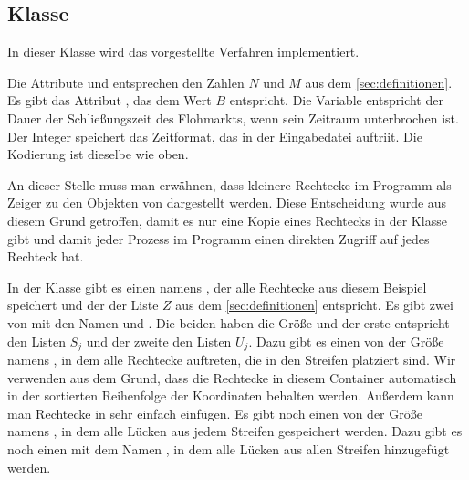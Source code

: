 \subsection{Klasse }
In dieser Klasse wird das vorgestellte Verfahren implementiert.

Die Attribute  und  entsprechen den Zahlen $N$ und $M$
aus dem \cref{sec:definitionen}. Es gibt das Attribut , das dem
Wert $B$ entspricht. Die Variable  entspricht der
Dauer der Schließungszeit des Flohmarkts, wenn sein Zeitraum unterbrochen ist.
Der Integer  speichert das Zeitformat, das in der Eingabedatei
auftriit. Die Kodierung ist dieselbe wie oben.

An dieser Stelle muss man erwähnen, dass kleinere Rechtecke im Programm als Zeiger zu 
den Objekten von  dargestellt werden.
Diese Entscheidung wurde aus diesem Grund getroffen, damit 
es nur eine Kopie eines Rechtecks in der Klasse  gibt und
damit jeder Prozess im Programm einen direkten Zugriff auf jedes Rechteck hat.

In der Klasse  gibt es einen  namens ,
der alle Rechtecke aus diesem Beispiel speichert und der der Liste $Z$
aus dem \cref{sec:definitionen} entspricht.
Es gibt zwei  von  mit den Namen 
 und . Die beiden 
haben die Größe  und der erste entspricht den Listen $S_j$ und
der zweite den Listen $U_j$.
Dazu gibt es einen  von  der Größe  namens ,
in dem alle Rechtecke auftreten, die in den Streifen platziert sind.
Wir verwenden  aus dem Grund, dass die Rechtecke in diesem Container 
automatisch in der sortierten Reihenfolge der Koordinaten  behalten werden.
Außerdem kann man Rechtecke in  sehr einfach einfügen.
Es gibt noch einen  von  der Größe  namens ,
in dem alle Lücken aus jedem Streifen gespeichert werden. 
Dazu gibt es noch einen  mit dem Namen , in dem alle Lücken
aus allen Streifen hinzugefügt werden.

